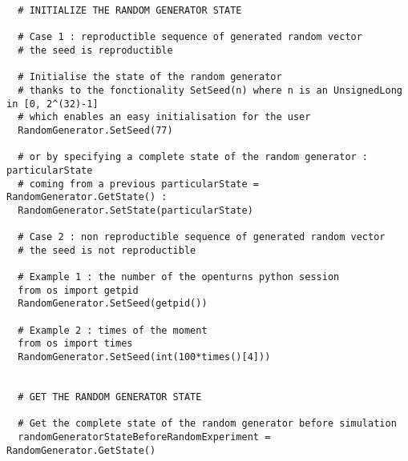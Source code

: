 \begin{lstlisting}
  # INITIALIZE THE RANDOM GENERATOR STATE

  # Case 1 : reproductible sequence of generated random vector
  # the seed is reproductible

  # Initialise the state of the random generator
  # thanks to the fonctionality SetSeed(n) where n is an UnsignedLong in [0, 2^(32)-1]
  # which enables an easy initialisation for the user
  RandomGenerator.SetSeed(77)

  # or by specifying a complete state of the random generator : particularState
  # coming from a previous particularState = RandomGenerator.GetState() :
  RandomGenerator.SetState(particularState)

  # Case 2 : non reproductible sequence of generated random vector
  # the seed is not reproductible

  # Example 1 : the number of the openturns python session
  from os import getpid
  RandomGenerator.SetSeed(getpid())

  # Example 2 : times of the moment
  from os import times
  RandomGenerator.SetSeed(int(100*times()[4]))


  # GET THE RANDOM GENERATOR STATE

  # Get the complete state of the random generator before simulation
  randomGeneratorStateBeforeRandomExperiment = RandomGenerator.GetState()
\end{lstlisting}
